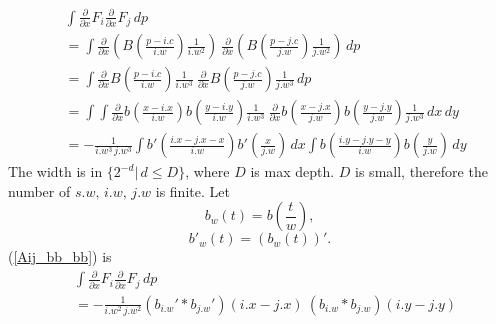 \documentclass[11pt,twoside]{article}
\begin{document}
\begin{equation}\label{Aij_bb_bb}
\begin{aligned}
& \int \frac{\partial}{\partial x} F_i \frac{\partial}{\partial x}  F_j \, dp \\
&= \int \frac{\partial}{\partial x} (B(\frac{p-i.c}{i.w})\frac{1}{i.w^2})\
\frac{\partial}{\partial x}  (B(\frac{p-j.c}{j.w})\frac{1}{j.w^2})\,  dp\\
&= \int \frac{\partial}{\partial x} B(\frac{p-i.c}{i.w})\frac{1}{i.w^3}\
\frac{\partial}{\partial x}  B(\frac{p-j.c}{j.w})\frac{1}{j.w^3}\,  dp\\
&= \int \int \frac{\partial}{\partial x} b(\frac{x-i.x}{i.w})b(\frac{y-i.y}{i.w})\frac{1}{i.w^3}\
\frac{\partial}{\partial x}  b(\frac{x-j.x}{j.w})b(\frac{y-j.y}{j.w})\frac{1}{j.w^3}\,  dx\,  dy\\
&= - \frac{1}{i.w^3\, j.w^3} \int b'(\frac{i.x-j.x-x}{i.w}) b'(\frac{x}{j.w})\,  dx
\int b(\frac{i.y-j.y-y}{i.w}) b(\frac{y}{j.w})\,  dy%
\end{aligned}
\end{equation}
The width is in \(\{2^{-d}|\,d\le D\}\), where \(D\) is max depth.
\(D\) is small, therefore the number of \(s.w,\,i.w,\,j.w\) is finite.
Let 
\begin{equation}b_w(t)=b(\frac{t}{w}),\end{equation}
\begin{equation}b'_w(t)=(b_w(t))'.\end{equation}
(\ref{Aij_bb_bb}) is 
\begin{equation}\label{xFixFjdp}
\begin{aligned}
& \int \frac{\partial}{\partial x} F_i \frac{\partial}{\partial x}  F_j \, dp \\
&= - \frac{1}{i.w^2\, j.w^2} (b_{i.w}'*b_{j.w}')(i.x-j.x)
\ (b_{i.w}*b_{j.w})(i.y-j.y)
\end{aligned}
\end{equation}
\end{document}
